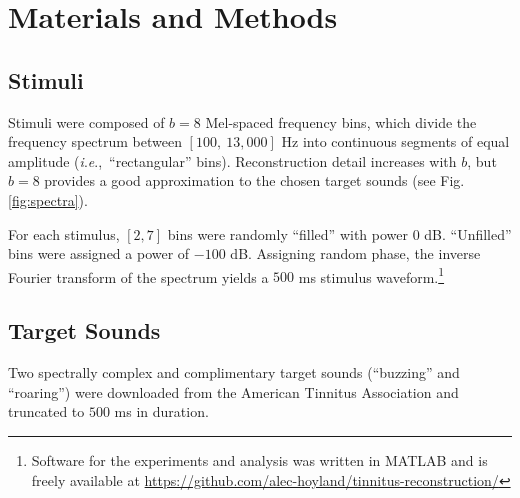 \documentclass[journal]{IEEEtran}
\newcommand{\ie}{\textit{i}.\textit{e}.,\ }
\begin{document}
\section{Materials and Methods}


\subsection{Stimuli}

Stimuli were composed of $b=8$ Mel-spaced frequency bins,
which divide the frequency spectrum between $[100,~13,000]$
Hz into continuous segments of equal amplitude (\ie ``rectangular'' bins).
Reconstruction detail increases with $b$, but $b=8$ provides a good approximation to the chosen target sounds (see Fig. \ref{fig:spectra}).

For each stimulus, $[2,7]$ bins were randomly ``filled'' with power $0$ dB. ``Unfilled'' bins were assigned a power of $-100$ dB. 
Assigning random phase, the inverse Fourier transform of the spectrum yields a $500$ ms stimulus waveform.\footnote{Software for the experiments and analysis was written in MATLAB and is freely available at \protect\url{https://github.com/alec-hoyland/tinnitus-reconstruction/}}

\subsection{Target Sounds}

Two spectrally complex and complimentary target sounds (``buzzing'' and ``roaring'') were downloaded from the American Tinnitus Association \cite{MeasuringTinnitusAmerican2022} and truncated to $500$ ms in duration.
\end{document}
